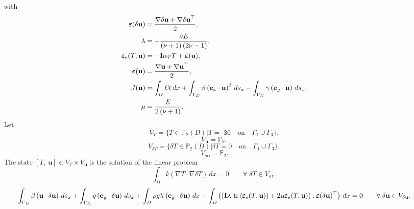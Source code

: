 \documentclass[preview]{standalone}
\let\oldcdot\cdot
\let\cdot\oldcdot
\begin{document}
with 
\begin{align*}
\pmb\varepsilon({\delta\mathbf{  u }}) &= \frac{ \nabla {\delta\mathbf{  u }}  +   \nabla {\delta\mathbf{  u }} ^\top }{2},\\
\lambda &= - \frac{\nu E}{\left(\nu + 1\right) \left(2 \nu - 1\right)},\\
\pmb\varepsilon_{e}(T,{\mathbf{ u }}) &= - \mathbf{I} \alpha_{T} T + \bm\varepsilon({\mathbf{ u }}),\\
\bm\varepsilon({\mathbf{ u }}) &= \frac{ \nabla {\mathbf{ u }}  +   \nabla {\mathbf{ u }} ^\top }{2},\\
J({\mathbf{ u }}) &=  \int_{D} \ell \raisebox{\depth}{$\chi$} \,dx +  \int_{\Gamma_D} \beta \left( \mathbf e_x \cdot {\mathbf{ u }} \right)^{2} \,ds_x -  \int_{\Gamma_N} \gamma \left( \mathbf e_y \cdot {\mathbf{ u }} \right) \,ds_x,\\
\mu &= \frac{E}{2 \left(\nu + 1\right)}.
 \end{align*}
Let
\begin{equation*}
V_{T} = \{ T \in \mathbb P_{2}(D)| T = \mathtt{\text{-30}}  \quad \text{{on}} \quad\Gamma_{1}\cup\Gamma_{3} \},\end{equation*}
\begin{equation*}
V_{{\mathbf{ u }}} = \mathbb P_{2},\end{equation*}
\begin{equation*}
V_{\delta T} = \{ \delta T \in \mathbb P_{2}(D)| \delta T = 0  \quad \text{{on}} \quad\Gamma_{1}\cup\Gamma_{3} \},\end{equation*}
\begin{equation*}
V_{{\delta\mathbf{  u }}} = \mathbb P_{2}.\end{equation*}
The state $\left[ T, \  {\mathbf{ u }}\right] \in  V_{T}\times V_{{\mathbf{ u }}}$ is the solution of the linear problem
\begin{dmath*}
 \int_{D} k \left(  \nabla T  \cdot  \nabla \delta T  \right) \,dx = 0\qquad \forall\; {\delta T\in V_{\delta T}} , 
\end{dmath*}
\begin{dmath*}
 \int_{\Gamma_D} \beta \left( {\mathbf{ u }} \cdot {\delta\mathbf{  u }} \right) \,ds_x +  \int_{\Gamma_N} q \left( \mathbf e_y \cdot {\delta\mathbf{  u }} \right) \,ds_x +  \int_{D} \rho g \raisebox{\depth}{$\chi$} \left( \mathbf e_y \cdot {\delta\mathbf{  u }} \right) \,dx +  \int_{D} \left( \left( \mathbf{I} \lambda  \,\operatorname{tr}\left(\pmb\varepsilon_{e}(T,{\mathbf{ u }})\right)  + 2 \mu \pmb\varepsilon_{e}(T,{\mathbf{ u }}) \right) \mathrel{:}  \pmb\varepsilon({\delta\mathbf{  u }})^\top  \right) \,dx = 0\qquad \forall\; {{\delta\mathbf{  u }}\in V_{{\delta\mathbf{  u }}}} . 
\end{dmath*}
\end{document}
